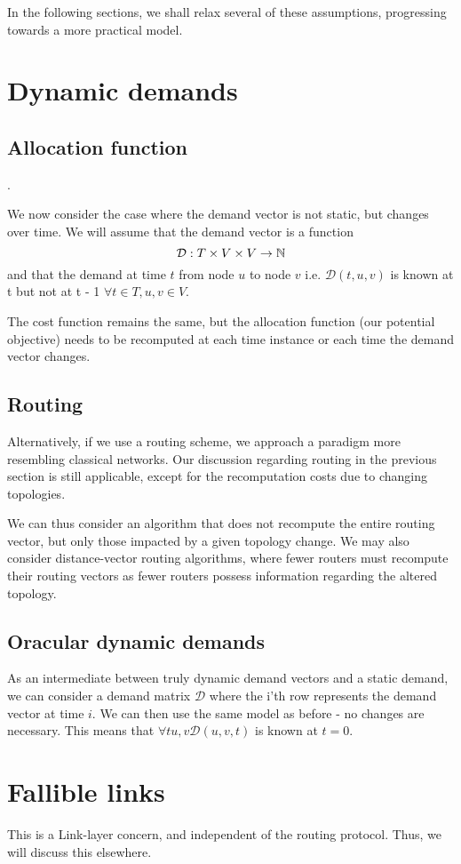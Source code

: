 \documentclass{amsart}
\begin{document}
    In the following sections, we shall relax several of these assumptions, progressing towards a more practical model.

    \section{Dynamic demands}

    \subsection{Allocation function}.

    We now consider the case where the demand vector is not static, but changes over time. We will assume that the demand vector is a function \[\mathcal{D} : T \times V \times V \rightarrow \mathbb{N}\] and that the demand at time \(t\) from node \(u\) to node \(v\) i.e. \(\mathcal{D}(t, u, v)\) is known at t but not at t - 1 \(\forall t \in T, u, v \in V\).

    The cost function remains the same, but the allocation function (our potential objective) needs to be recomputed at each time instance or each time the demand vector changes.

    \subsection{Routing}

    Alternatively, if we use a routing scheme, we approach a paradigm more resembling classical networks. Our discussion regarding routing in the previous section is still applicable, except for the recomputation costs due to changing topologies.

    We can thus consider an algorithm that does not recompute the entire routing vector, but only those impacted by a given topology change. We may also consider distance-vector routing algorithms, where fewer routers must recompute their routing vectors as fewer routers possess information regarding the altered topology.

    \subsection{Oracular dynamic demands}

    As an intermediate between truly dynamic demand vectors and a static demand, we can consider a demand matrix \(\mathcal{D}\) where the i'th row represents the demand vector at time \(i\). We can then use the same model as before - no changes are necessary. This means that \(\forall t u, v \mathcal{D}(u, v, t)\) is known at \(t = 0\).

    \section{Fallible links}

    This is a Link-layer concern, and independent of the routing protocol. Thus, we will discuss this elsewhere.
\end{document}
